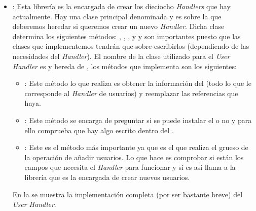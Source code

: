\begin{itemize}
\item {}: Esta librería es la encargada de crear los dieciocho \textit{Handlers} que hay actualmente. Hay una clase principal denominada  y es sobre la que deberemos heredar si queremos crear un nuevo \textit{Handler}. Dicha clase determina los siguientes métodos: , , ,  y  y son importantes puesto que las clases que implementemos tendrán que sobre-escribirlos (dependiendo de las necesidades del \textit{Handler}). El nombre de la clase utilizado para el \textit{User Handler} es  y hereda de , los métodos que implementa son los siguientes:
\begin{itemize}
\item {}: Este método lo que realiza es obtener la información del \profile{} (todo lo que le corresponde al \textit{Handler} de usuarios) y reemplazar las referencias que haya.
\item {}: Este método se encarga de preguntar si se puede instalar el \profile{} o no y para ello comprueba que hay algo escrito dentro del \profile{}.
\item {}: Este es el método más importante ya que es el que realiza el grueso de la operación de añadir usuarios. Lo que hace es comprobar si están los campos que necesita el \textit{Handler} para funcionar y si es así llama a la librería  que es la encargada de crear nuevos usuarios.
\end{itemize}
En la  se muestra la implementación completa (por ser bastante breve) del \textit{User Handler}.
\end{itemize}

